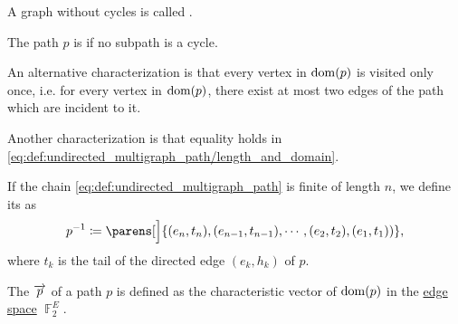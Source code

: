 \begin{definition}
\begin{thmenum}
    A graph without cycles is called .

     The path \( p \) is  if no subpath is a cycle.

    An alternative characterization is that every vertex in \( \operatorname{dom}(p) \) is visited only once, i.e. for every vertex in \( \operatorname{dom}(p) \), there exist at most two edges of the path which are incident to it.

    Another characterization is that equality holds in \eqref{eq:def:undirected_multigraph_path/length_and_domain}.

     If the chain \eqref{eq:def:undirected_multigraph_path} is finite of length \( n \), we define its  as
    \begin{equation*}
      p^{-1} \coloneqq \parens[\Big]{ (e_n, t_n), (e_{n-1}, t_{n-1}), \cdots, (e_2, t_2), (e_1, t_1)) },
    \end{equation*}
    where \( t_k \) is the tail of the directed edge \( (e_k, h_k) \) of \( p \).

     The  \( \overrightarrow{p} \) of a path \( p \) is defined as the characteristic vector of \( \operatorname{dom}(p) \) in the \hyperref[def:hypergraph_vector_spaces/edge]{edge space} \( \BbbF_2^E \).
  \end{thmenum}
\end{definition}

